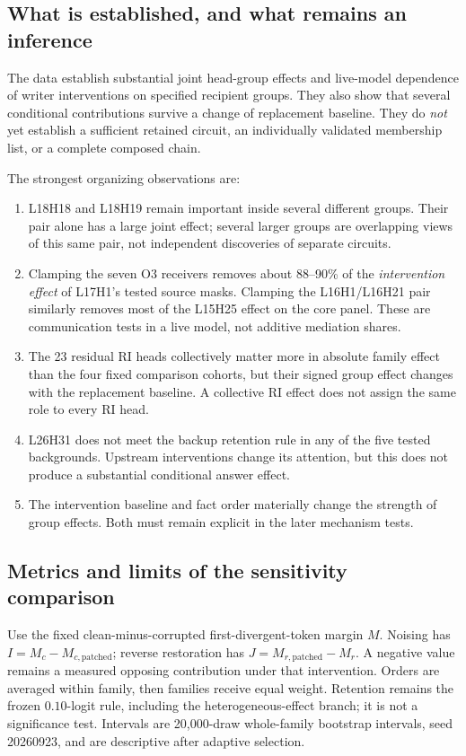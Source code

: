 \subsection{What is established, and what remains an inference}
The data establish substantial joint head-group effects and live-model dependence of writer interventions on specified recipient groups. They also show that several conditional contributions survive a change of replacement baseline. They do \emph{not} yet establish a sufficient retained circuit, an individually validated membership list, or a complete composed chain.

The strongest organizing observations are:
\begin{enumerate}
\item L18H18 and L18H19 remain important inside several different groups. Their pair alone has a large joint effect; several larger groups are overlapping views of this same pair, not independent discoveries of separate circuits.
\item Clamping the seven O3 receivers removes about 88--90\% of the \emph{intervention effect} of L17H1's tested source masks. Clamping the L16H1/L16H21 pair similarly removes most of the L15H25 effect on the core panel. These are communication tests in a live model, not additive mediation shares.
\item The 23 residual RI heads collectively matter more in absolute family effect than the four fixed comparison cohorts, but their signed group effect changes with the replacement baseline. A collective RI effect does not assign the same role to every RI head.
\item L26H31 does not meet the backup retention rule in any of the five tested backgrounds. Upstream interventions change its attention, but this does not produce a substantial conditional answer effect.
\item The intervention baseline and fact order materially change the strength of group effects. Both must remain explicit in the later mechanism tests.
\end{enumerate}

\subsection{Metrics and limits of the sensitivity comparison}
Use the fixed clean-minus-corrupted first-divergent-token margin $M$. Noising has $I=M_c-M_{c,\mathrm{patched}}$; reverse restoration has $J=M_{r,\mathrm{patched}}-M_r$. A negative value remains a measured opposing contribution under that intervention. Orders are averaged within family, then families receive equal weight. Retention remains the frozen $0.10$-logit rule, including the heterogeneous-effect branch; it is not a significance test. Intervals are 20,000-draw whole-family bootstrap intervals, seed 20260923, and are descriptive after adaptive selection.

